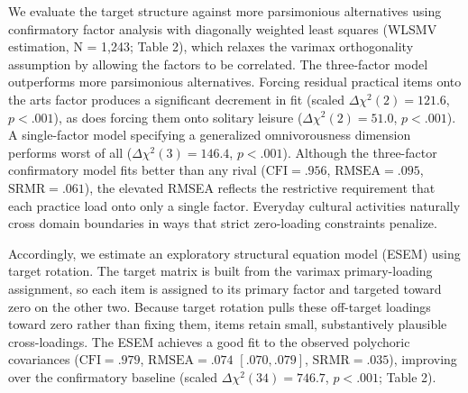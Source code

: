 \documentclass[
  12pt
]{article}
\begin{document}
We evaluate the target structure against more parsimonious alternatives using confirmatory factor analysis with diagonally weighted least squares (WLSMV estimation, N = 1,243; Table 2), which relaxes the varimax orthogonality assumption by allowing the factors to be correlated. The three-factor model outperforms more parsimonious alternatives. Forcing residual practical items onto the arts factor produces a significant decrement in fit (scaled $\Delta\chi^2(2) = 121.6$, $p < .001$), as does forcing them onto solitary leisure ($\Delta\chi^2(2) = 51.0$, $p < .001$). A single-factor model specifying a generalized omnivorousness dimension performs worst of all ($\Delta\chi^2(3) = 146.4$, $p < .001$). Although the three-factor confirmatory model fits better than any rival ($\text{CFI} = .956$, $\text{RMSEA} = .095$, $\text{SRMR} = .061$), the elevated RMSEA reflects the restrictive requirement that each practice load onto only a single factor. Everyday cultural activities naturally cross domain boundaries in ways that strict zero-loading constraints penalize.

Accordingly, we estimate an exploratory structural equation model (ESEM) using target rotation. The target matrix is built from the varimax primary-loading assignment, so each item is assigned to its primary factor and targeted toward zero on the other two. Because target rotation pulls these off-target loadings toward zero rather than fixing them, items retain small, substantively plausible cross-loadings. The ESEM achieves a good fit to the observed polychoric covariances ($\text{CFI} = .979$, $\text{RMSEA} = .074$ $[.070, .079]$, $\text{SRMR} = .035$), improving over the confirmatory baseline (scaled $\Delta\chi^2(34) = 746.7$, $p < .001$; Table 2). 
\end{document}
